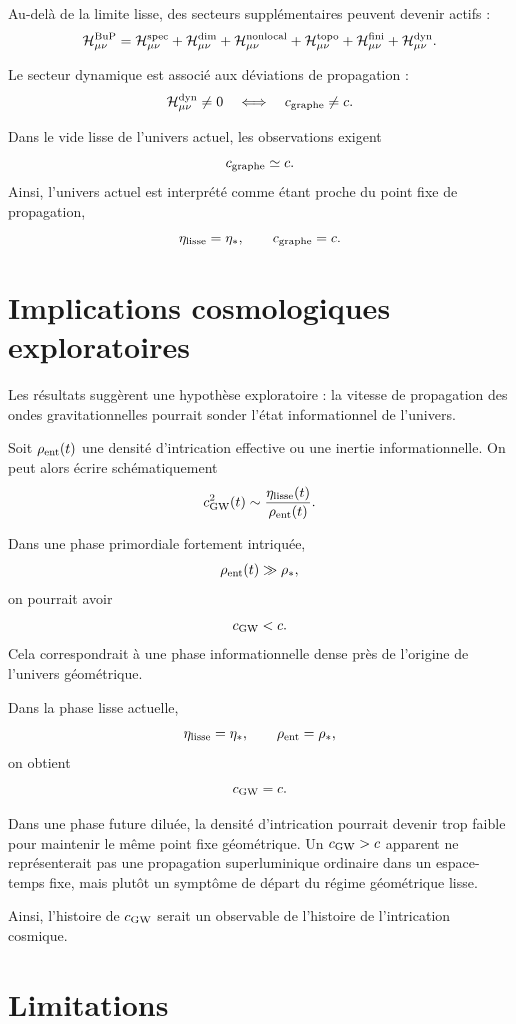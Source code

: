 \documentclass[11pt,a4paper]{article}
\begin{document}
Au-delà de la limite lisse, des secteurs supplémentaires peuvent devenir actifs :
\[
\mathcal H_{\mu\nu}^{\rm BuP}
=
\mathcal H_{\mu\nu}^{\rm spec}
+
\mathcal H_{\mu\nu}^{\rm dim}
+
\mathcal H_{\mu\nu}^{\rm nonlocal}
+
\mathcal H_{\mu\nu}^{\rm topo}
+
\mathcal H_{\mu\nu}^{\rm fini}
+
\mathcal H_{\mu\nu}^{\rm dyn}.
\]

Le secteur dynamique est associé aux déviations de propagation :
\[
\mathcal H_{\mu\nu}^{\rm dyn} \neq 0
\quad\Longleftrightarrow\quad
c_{\rm graphe} \neq c.
\]

Dans le vide lisse de l'univers actuel, les observations exigent
\[
c_{\rm graphe} \simeq c.
\]
Ainsi, l'univers actuel est interprété comme étant proche du point fixe de
propagation,
\[
\eta_{\rm lisse} = \eta_\ast,
\qquad
c_{\rm graphe} = c.
\]

\section{Implications cosmologiques exploratoires}

Les résultats suggèrent une hypothèse exploratoire : la vitesse de propagation
des ondes gravitationnelles pourrait sonder l'état informationnel de l'univers.

Soit \(\rho_{\rm ent}(t)\) une densité d'intrication effective ou une inertie
informationnelle. On peut alors écrire schématiquement
\[
c_{\rm GW}^2(t) \sim \frac{\eta_{\rm lisse}(t)}{\rho_{\rm ent}(t)}.
\]

Dans une phase primordiale fortement intriquée,
\[
\rho_{\rm ent}(t) \gg \rho_\ast,
\]
on pourrait avoir
\[
c_{\rm GW} < c.
\]
Cela correspondrait à une phase informationnelle dense près de l'origine de
l'univers géométrique.

Dans la phase lisse actuelle,
\[
\eta_{\rm lisse} = \eta_\ast,
\qquad
\rho_{\rm ent} = \rho_\ast,
\]
on obtient
\[
c_{\rm GW} = c.
\]

Dans une phase future diluée, la densité d'intrication pourrait devenir trop
faible pour maintenir le même point fixe géométrique. Un \(c_{\rm GW} > c\)
apparent ne représenterait pas une propagation superluminique ordinaire dans un
espace-temps fixe, mais plutôt un symptôme de départ du régime géométrique lisse.

Ainsi, l'histoire de \(c_{\rm GW}\) serait un observable de l'histoire de
l'intrication cosmique.

\section{Limitations}
\end{document}

